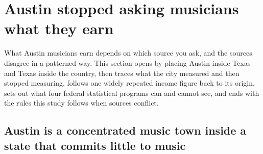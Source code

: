 \section{Austin stopped asking musicians what they earn}
\label{sec:measurement}

What Austin musicians earn depends on which source you ask, and the sources
disagree in a patterned way. This section opens by placing Austin inside Texas
and Texas inside the country, then traces what the city measured and then
stopped measuring, follows one widely repeated income figure back to its origin,
sets out what four federal statistical programs can and cannot see, and ends
with the rules this study follows when sources conflict.

\subsection{Austin is a concentrated music town inside a state that commits
little to music}

